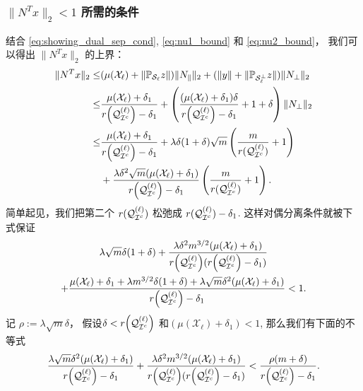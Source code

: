\subsubsection{ \(\|N^T x\|_2<1\) 所需的条件}
结合 \eqref{eq:showing_dual_sep_cond}, \eqref{eq:nu1_bound} 和 \eqref{eq:nu2_bound}， 
我们可以得出 \(\|N^T x\|_2\) 的上界：
\begin{align*}
  \|N^T x\|_2 \leq& (\mu(\mathcal{X}_{\ell})+\|\mathbb{P}_{\mathcal{S}_{\ell}}z\|) 
  \|N_{\parallel}\|_2+(\|y\|+\|\mathbb{P}_{\mathcal{S}_{\ell}^{\perp}}z\|)\|N_{\perp}\|_2\\
  \leq&\frac{\mu(\mathcal{X}_\ell)+\delta_1}{r{\left(\mathcal{Q}_{\mathcal{I}^c}^{(\ell)}\right)}-\delta_1}
  +\left(\frac{(\mu(\mathcal{X}_{\ell})+\delta_1)\delta}{r{\left( \mathcal{Q}_{\mathcal{I}^c}^{(\ell)}\right)}-\delta_1}+1+\delta\right)
  \|N_{\perp}\|_2\\
  \leq& \frac{\mu(\mathcal{X}_{\ell})+\delta_1}{r{\left( \mathcal{Q}_{\mathcal{I}^c}^{(\ell)}\right)}-\delta_1} +
  \lambda\delta(1+\delta)\sqrt{m}
  \left(\frac{m}{r(\mathcal{Q}_{\mathcal{I}^c}^{(\ell)})}+1\right) \\
  &+ \frac{\lambda\delta^2\sqrt{m}(\mu(\mathcal{X}_{\ell})+\delta_1)}
  {r{\left( \mathcal{Q}_{\mathcal{I}^c}^{(\ell)}\right)}-\delta_1}\left(\frac{m}{r(\mathcal{Q}_{\mathcal{I}^c}^{(\ell)})}+1\right).
\end{align*}
简单起见，我们把第二个 \(r(\mathcal{Q}_{\mathcal{I}^c}^{(\ell)})\) 松弛成 \(r(\mathcal{Q}_{\mathcal{I}^c}^{(\ell)})-\delta_1\).
这样对偶分离条件就被下式保证
\begin{multline}\label{eq:dual_cond_full}
   \lambda\sqrt{m}\delta(1+\delta)
  +\frac{\lambda\delta^2 m^{3/2}(\mu(\mathcal{X}_{\ell})+\delta_1)}
  {r{\left( \mathcal{Q}_{\mathcal{I}^c}^{(\ell)}\right)}(r{\left(
    \mathcal{Q}_{\mathcal{I}^c}^{(\ell)}\right)}-\delta_1)} \\
  +\frac{\mu(\mathcal{X}_{\ell})+\delta_1 +\lambda m^{3/2}\delta(1+\delta)+
  \lambda\sqrt{m}\delta^2(\mu(\mathcal{X}_{\ell})+\delta_1)}
  {r{\left( \mathcal{Q}_{\mathcal{I}^c}^{(\ell)}\right)}-\delta_1}<1.
\end{multline}
记 \(\rho:=\lambda\sqrt{m}\delta\)， 假设\(\delta<r{\left(\mathcal{Q}_{\mathcal{I}^c}^{(\ell)}\right)}\)
和\((\mu(\mathcal{X}_{\ell})+\delta_1)<1\), 那么我们有下面的不等式
\begin{align*}
  \frac{\lambda\sqrt{m}\delta^2(\mu(\mathcal{X}_{\ell})+\delta_1)}
  {r{\left( \mathcal{Q}_{\mathcal{I}^c}^{(\ell)}\right)}-\delta_1}
  +\frac{\lambda\delta^2 m^{3/2}(\mu(\mathcal{X}_{\ell})+\delta_1)}
  {r{\left( \mathcal{Q}_{\mathcal{I}^c}^{(\ell)}\right)}(r{\left( \mathcal{Q}_{\mathcal{I}^c}^{(\ell)}\right)}-\delta_1)}
  < \frac{\rho (m+\delta)}{r{\left( \mathcal{Q}_{\mathcal{I}^c}^{(\ell)}\right)}-\delta_1}.
\end{align*}
